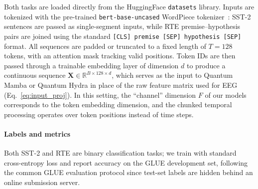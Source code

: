 \documentclass[conference]{IEEEtran}
\begin{document}
Both tasks are loaded directly from the HuggingFace \texttt{datasets} library.
Inputs are tokenized with the pre-trained \texttt{bert-base-uncased} WordPiece tokenizer~\cite{devlin2019bert}: SST-2 sentences are passed as single-segment inputs, while RTE premise--hypothesis pairs are joined using the standard \texttt{[CLS]\,premise\,[SEP]\,hypothesis\,[SEP]} format.
All sequences are padded or truncated to a fixed length of $T = 128$ tokens, with an attention mask tracking valid positions.
Token IDs are then passed through a trainable embedding layer of dimension $d$ to produce a continuous sequence $\mathbf{X} \in \mathbb{R}^{B \times 128 \times d}$, which serves as the input to Quantum Mamba or Quantum Hydra in place of the raw feature matrix used for EEG (Eq.~\eqref{eq:input_proj}).
In this setting, the ``channel'' dimension $F$ of our models corresponds to the token embedding dimension, and the chunked temporal processing operates over token positions instead of time steps.

\paragraph{Labels and metrics}
Both SST-2 and RTE are binary classification tasks; we train with standard cross-entropy loss and report accuracy on the GLUE development set, following the common GLUE evaluation protocol since test-set labels are hidden behind an online submission server.
\end{document}
